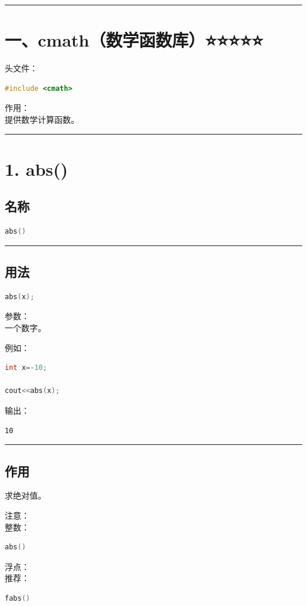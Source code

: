 \documentclass[9pt,twocolumn]{extarticle}
\begin{document}
\noindent\rule{\linewidth}{0.4pt}

\section{一、cmath（数学函数库）⭐⭐⭐⭐⭐}

头文件：
\begin{lstlisting}[language=C++]
#include <cmath>
\end{lstlisting}
作用：\\
提供数学计算函数。

\noindent\rule{\linewidth}{0.4pt}

\section{1. abs()}

\subsection{名称}
\begin{lstlisting}[language=C++]
abs()
\end{lstlisting}

\noindent\rule{\linewidth}{0.4pt}

\subsection{用法}
\begin{lstlisting}[language=C++]
abs(x);
\end{lstlisting}
参数：\\
一个数字。

例如：
\begin{lstlisting}[language=C++]
int x=-10;

cout<<abs(x);
\end{lstlisting}
输出：
\begin{lstlisting}
10
\end{lstlisting}

\noindent\rule{\linewidth}{0.4pt}

\subsection{作用}
求绝对值。

注意：\\
整数：
\begin{lstlisting}[language=C++]
abs()
\end{lstlisting}
浮点：\\
推荐：
\begin{lstlisting}[language=C++]
fabs()
\end{lstlisting}
\end{document}
